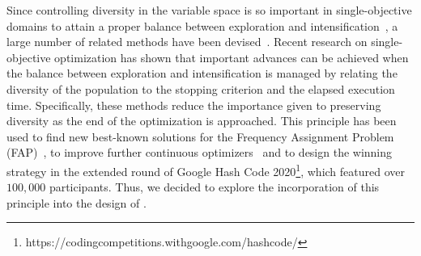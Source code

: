 Since controlling diversity in the variable space is 
so important in single-objective domains to attain a proper balance between exploration and intensification~\cite{lin2009auto},
a large number of related methods have been devised~\cite{Joel:Crepinsek}. 
%
%
%
%
%
%
Recent research on single-objective optimization has shown that important advances can be achieved when the
balance between exploration and intensification is managed by relating the diversity of the population to 
the stopping criterion and the elapsed execution time.
%
Specifically, these methods reduce the importance given to preserving diversity as the end of the optimization
is approached.
%
This principle has been used to find new best-known solutions for the Frequency Assignment Problem 
(FAP)~\cite{segura2016improving}, to improve further continuous optimizers~\cite{castillo2019differential} and
to design the winning strategy in the extended round of Google Hash Code 
2020\footnote{https://codingcompetitions.withgoogle.com/hashcode/}, which featured over $100,000$ participants.
%
Thus, we decided to explore the incorporation of this principle into the design of \MOEAS{}.
%
%
%


